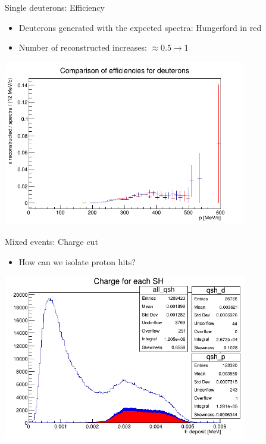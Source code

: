 \documentclass[10pt]{beamer}
\begin{document}
%
\begin{frame}{Single deuterons: Efficiency}
\begin{itemize}
\item Deuterons generated with the expected spectra: Hungerford in red\\
\item Number of reconstructed increases: $\approx 0.5\rightarrow 1$ \textperthousand
\end{itemize}
\begin{center}
\includegraphics[width=0.8\textwidth]{plots/ejected/deuterons_eff_comparison}
\end{center}
\end{frame}

%
\begin{frame}{Mixed events: Charge cut}
\begin{itemize}
\item How can we isolate proton hits?
\end{itemize}
\begin{center}
\includegraphics[width=0.8\textwidth]{plots/mix/mix500_qsh_Ps}
\end{center}
\end{frame}
\end{document}
